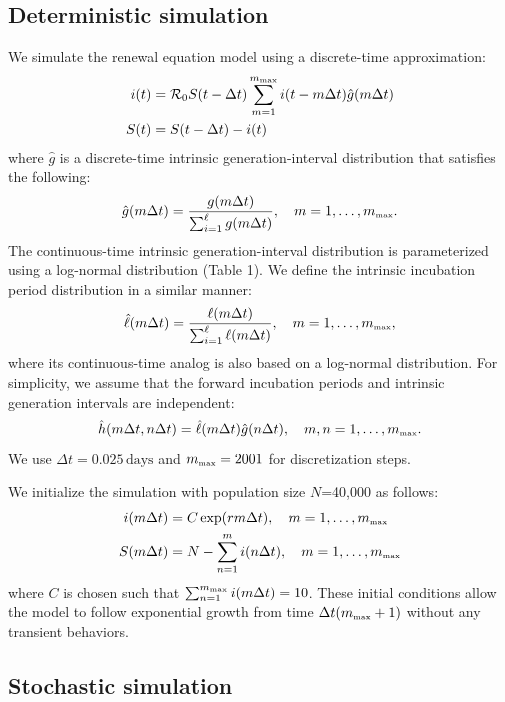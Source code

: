 \documentclass[12pt]{article}
\newcommand{\Rx}[1]{\ensuremath{{\mathcal R}_{#1}}\xspace}
\newcommand{\Ro}{\Rx{0}}
\newcommand{\tsub}[2]{#1_{{\textrm{\tiny #2}}}}
\newcommand{\gdist}{g} %
\newcommand{\idist}{\ell} %
\begin{document}
\subsection{Deterministic simulation}

We simulate the renewal equation model using a discrete-time approximation:
\begin{align}
i(t) &= \Ro S(t-\Delta t) \sum_{m=1}^{\tsub{m}{max}} i(t-m \Delta t) \hat{\gdist}(m \Delta t) \nonumber \\
S(t) &= S(t-\Delta t) - i(t)
\end{align}
where $\hat{\gdist}$ is a discrete-time intrinsic generation-interval distribution that satisfies the following:
\begin{equation}
\hat{\gdist}(m \Delta t) = \frac{\gdist(m \Delta t)}{\sum_{i=1}^\ell \gdist(m \Delta t)}, \quad m=1, \dots, \tsub{m}{max}.
\end{equation}
The continuous-time intrinsic generation-interval distribution is parameterized using a log-normal distribution (Table 1). We define the intrinsic incubation period distribution in a similar manner:
\begin{equation}
\hat{\idist}(m \Delta t) = \frac{\idist(m \Delta t)}{\sum_{i=1}^\ell \idist(m \Delta t)}, \quad m=1, \dots, \tsub{m}{max},
\end{equation}
where its continuous-time analog is also based on a log-normal distribution.
For simplicity, we assume that the forward incubation periods and intrinsic generation intervals are independent:
\begin{equation}
\hat{h}(m \Delta t, n \Delta t) = \hat{\idist}(m \Delta t)\hat{\gdist}(n \Delta t), \quad m,n=1, \dots, \tsub{m}{max}.
\end{equation}
We use $\Delta t = 0.025\,\textrm{days}$ and $\tsub{m}{max}=2001$ for discretization steps.

We initialize the simulation with population size $N$=40,000 as follows:
\begin{align}
i(m \Delta t) &= C \exp(r m \Delta t), \quad m=1, \dots, \tsub{m}{max}\nonumber \\
S(m \Delta t) &= N - \sum_{n=1}^m i(n \Delta t), \quad m=1, \dots, \tsub{m}{max}
\end{align}
where $C$ is chosen such that $\sum_{n=1}^{\tsub{m}{max}} i(m \Delta t)=10$.
These initial conditions allow the model to follow exponential growth from time $\Delta t (\tsub{m}{max} + 1)$ without any transient behaviors.

\subsection{Stochastic simulation}
\end{document}
